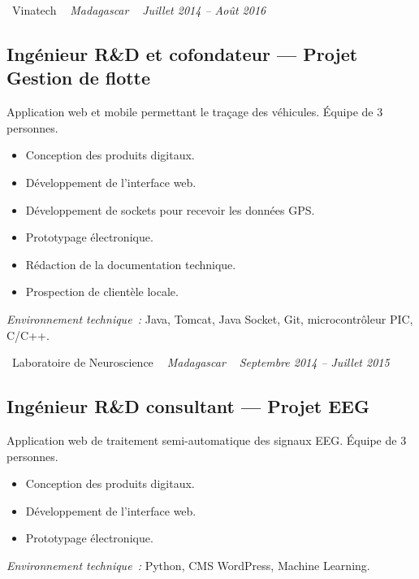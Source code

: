 \documentclass[10pt,a4paper]{article}
\begin{document}
\vspace{10pt}

\noindent\textcolor{primary}{ \faBuilding\ Vinatech} \quad
\textit{ \small \textcolor{darkgray}{ \faMapMarker\ } Madagascar } \hfill
\textit{ \small \textcolor{darkgray}{ \faCalendar\ } Juillet 2014 -- Août 2016 }

\vspace{4pt}

\subsection*{Ingénieur R\&D et cofondateur --- Projet Gestion de flotte}
\color{darkgray}
Application web et mobile permettant le traçage des véhicules. Équipe de 3 personnes.
\begin{itemize}
  \item Conception des produits digitaux.
  \item Développement de l'interface web.
  \item Développement de sockets pour recevoir les données GPS.
  \item Prototypage électronique.
  \item Rédaction de la documentation technique.
  \item Prospection de clientèle locale.
\end{itemize}
\textit{Environnement technique~:} Java, Tomcat, Java Socket, Git, microcontrôleur PIC, C/C++.

\vspace{10pt}

\noindent\textcolor{primary}{ \faBuilding\ Laboratoire de Neuroscience} \quad
\textit{ \small \textcolor{darkgray}{ \faMapMarker\ } Madagascar } \hfill
\textit{ \small \textcolor{darkgray}{ \faCalendar\ } Septembre 2014 -- Juillet 2015 }

\vspace{4pt}

\subsection*{Ingénieur R\&D consultant --- Projet EEG}
\color{darkgray}
Application web de traitement semi-automatique des signaux EEG. Équipe de 3 personnes.
\begin{itemize}
  \item Conception des produits digitaux.
  \item Développement de l'interface web.
  \item Prototypage électronique.
\end{itemize}
\textit{Environnement technique~:} Python, CMS WordPress, Machine Learning.
\end{document}
